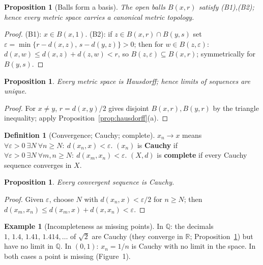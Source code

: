 \documentclass[11pt,a4paper]{article}
\newtheorem{proposition}[theorem]{Proposition}
\theoremstyle{definition}
\newtheorem{definition}[theorem]{Definition}
\newtheorem{example}[theorem]{Example}
\newcommand{\R}{\mathbb{R}}
\newcommand{\Q}{\mathbb{Q}}
\begin{document}
	\begin{proposition}[Balls form a basis]\label{prop:balls}
		The open balls $B(x,r)$ satisfy (B1),(B2); hence every metric space carries a canonical metric topology.
	\end{proposition}
	\begin{proof}
		(B1): $x\in B(x,1)$. (B2): if $z\in B(x,r)\cap B(y,s)$ set $\varepsilon=\min\{r-d(x,z),\,s-d(y,z)\}>0$;
		then for $w\in B(z,\varepsilon)$: $d(x,w)\le d(x,z)+d(z,w)<r$, so $B(z,\varepsilon)\subseteq B(x,r)$; symmetrically for $B(y,s)$.
	\end{proof}
	
	\begin{proposition}\label{prop:metric-hausdorff}
		Every metric space is Hausdorff; hence limits of sequences are unique.
	\end{proposition}
	\begin{proof}
		For $x\neq y$, $r=d(x,y)/2$ gives disjoint $B(x,r),B(y,r)$ by the triangle inequality; apply Proposition~\ref{prop:hausdorff}(a).
	\end{proof}
	
	\begin{definition}[Convergence; Cauchy; complete]
		$x_n\to x$ means $\forall\varepsilon>0\ \exists N\ \forall n\ge N:\ d(x_n,x)<\varepsilon$. $(x_n)$ is
		\textbf{Cauchy} if $\forall\varepsilon>0\ \exists N\ \forall m,n\ge N:\ d(x_m,x_n)<\varepsilon$.
		$(X,d)$ is \textbf{complete} if every Cauchy sequence converges in $X$.
	\end{definition}
	
	\begin{proposition}\label{prop:conv-cauchy}
		Every convergent sequence is Cauchy.
	\end{proposition}
	\begin{proof}
		Given $\varepsilon$, choose $N$ with $d(x_n,x)<\varepsilon/2$ for $n\ge N$; then
		$d(x_m,x_n)\le d(x_m,x)+d(x,x_n)<\varepsilon$.
	\end{proof}
	
	\begin{example}[Incompleteness as missing points]\label{ex:incomplete}
		In $\Q$: the decimals $1,\,1.4,\,1.41,\,1.414,\dots$ of $\sqrt2$ are Cauchy (they converge in $\R$;
		Proposition~\ref{prop:conv-cauchy}) but have no limit in $\Q$. In $(0,1)$: $x_n=1/n$ is Cauchy with no
		limit in the space. In both cases a point is missing (Figure~1).
	\end{example}
	
\end{document}
